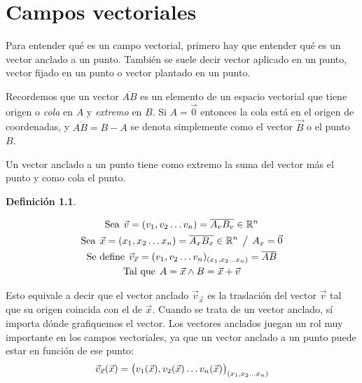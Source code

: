 \documentclass[a5paper,12pt,twoside]{book}
\newtheorem{defn}{{Definición}}[chapter]
\begin{document}
\chapter{Campos vectoriales}


Para entender qué es un campo vectorial, primero hay que entender qué es un vector anclado a un punto. También se suele decir vector aplicado en un punto, vector fijado en un punto o vector plantado en un punto.

Recordemos que un vector $\overline{AB}$ es un elemento de un espacio vectorial que tiene origen o \emph{cola} en $A$ y \emph{extremo} en $B$. Si $A=\Vec{0}$ entonces la cola está en el origen de coordenadas, y $\overline{AB}=B-A$ se denota simplemente como el vector $\Vec{B}$ o el punto $B$.

Un vector anclado a un punto tiene como extremo la suma del vector más el punto y como cola el punto.

\begin{mdframed}[style=MyFrame1]
    \begin{defn}
    \end{defn}
    \begin{gather*}
        \textrm{Sea} \hspace{1ex} \Vec{v} = (v_1,v_2 \dots v_n) = \overline{A_v B_v} \in \mathbb{R}^n
        \\
        \textrm{Sea} \hspace{1ex} \Vec{x} = (x_1,x_2 \dots x_n) = \overline{A_x B_x} \in \mathbb{R}^n \hspace{1ex} \big/ \hspace{1ex} A_x = \Vec{0}
        \\
        \textrm{Se define} \hspace{1ex} \Vec{v}_{\Vec{x}} = (v_1,v_2 \dots v_n)_{(x_1,x_2 \dots x_n)} = \overline{AB}
        \\
        \textrm{Tal que} \hspace{1ex} A=\Vec{x} \land B=\Vec{x}+\Vec{v}
    \end{gather*}
\end{mdframed}

Esto equivale a decir que el vector anclado $\Vec{v}_{\Vec{x}}$ es la traslación del vector $\Vec{v}$ tal que su origen coincida con el de $\Vec{x}$. Cuando se trata de un vector anclado, sí importa dónde grafiquemos el vector. Los vectores anclados juegan un rol muy importante en los campos vectoriales, ya que un vector anclado a un punto puede estar en función de ese punto:
\begin{equation*}
    \Vec{v}_{\Vec{x}} (\Vec{x}) = \big( v_1(\Vec{x}),v_2(\Vec{x}) \dots v_n(\Vec{x}) \big)_{(x_1,x_2 \dots x_n)}
\end{equation*}
\end{document}
